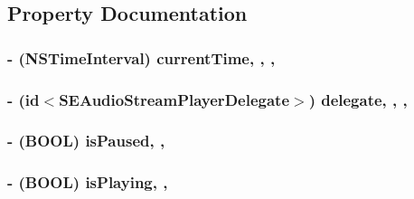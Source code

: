 \subsection{Property Documentation}
\hypertarget{interface_s_e_audio_stream_player_a079874e98c33b3fc543f9ca6ea2a59e7}{
\subsubsection[{current\-Time}]{\setlength{\rightskip}{0pt plus 5cm}-\/ (N\-S\-Time\-Interval) current\-Time\hspace{0.3cm}{\ttfamily [read]}, {\ttfamily [write]}, {\ttfamily [nonatomic]}, {\ttfamily [assign]}}}\label{interface_s_e_audio_stream_player_a079874e98c33b3fc543f9ca6ea2a59e7}
\hypertarget{interface_s_e_audio_stream_player_a423b5909f11bd592bbef74ac92b18a30}{
\subsubsection[{delegate}]{\setlength{\rightskip}{0pt plus 5cm}-\/ (id$<${\bf S\-E\-Audio\-Stream\-Player\-Delegate}$>$) delegate\hspace{0.3cm}{\ttfamily [read]}, {\ttfamily [write]}, {\ttfamily [nonatomic]}, {\ttfamily [weak]}}}\label{interface_s_e_audio_stream_player_a423b5909f11bd592bbef74ac92b18a30}
\hypertarget{interface_s_e_audio_stream_player_ad6bec3654ff73d3fd4d11111a1f69442}{
\subsubsection[{is\-Paused}]{\setlength{\rightskip}{0pt plus 5cm}-\/ (B\-O\-O\-L) is\-Paused\hspace{0.3cm}{\ttfamily [read]}, {\ttfamily [nonatomic]}, {\ttfamily [assign]}}}\label{interface_s_e_audio_stream_player_ad6bec3654ff73d3fd4d11111a1f69442}
\hypertarget{interface_s_e_audio_stream_player_ae9c780174af7f5d4bbd970049f7d1bb5}{
\subsubsection[{is\-Playing}]{\setlength{\rightskip}{0pt plus 5cm}-\/ (B\-O\-O\-L) is\-Playing\hspace{0.3cm}{\ttfamily [read]}, {\ttfamily [nonatomic]}, {\ttfamily [assign]}}}\label{interface_s_e_audio_stream_player_ae9c780174af7f5d4bbd970049f7d1bb5}


